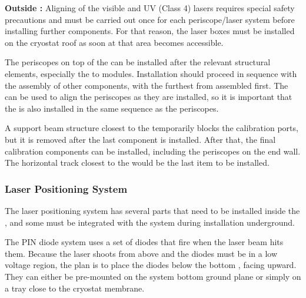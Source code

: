 {\bf Outside :}  Aligning of the visible and UV (Class 4) lasers requires special safety precautions and must be carried out once for each periscope/laser system before installing further  components. For that reason, the laser boxes must be installed on the cryostat roof as soon at that area becomes accessible. 

The periscopes on top of the  can be installed after the relevant structural elements, especially the to  modules. Installation should proceed in sequence with the assembly of other components, with the furthest from  assembled first. The  can be used to align the periscopes as they are installed, so it is important that the  is also installed in the same sequence as the periscopes. %


A support beam structure closest to the  temporarily blocks the calibration ports, but it is removed after the last  component is installed. After that, the final calibration components can be installed, including the periscopes on the  end wall. The horizontal track closest to the  would be the last item to be installed. 

\subsubsection{Laser Positioning System}
The laser positioning system has several parts that need to be installed inside the , and some must be integrated with the 
 system during installation underground. 

The PIN diode system uses a set of diodes that fire when the laser beam hits them. Because the laser shoots from above and the diodes must be in a low voltage region, the plan is to place the diodes below the bottom , facing upward. They can either be pre-mounted on the  system bottom ground plane or simply on a tray close to the cryostat membrane.

